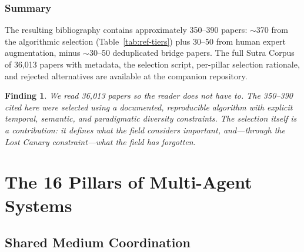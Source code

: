 \documentclass{article}
\newtheorem{finding}{Finding}
\begin{document}
\subsubsection{Summary}

The resulting bibliography contains approximately 350--390 papers:
$\sim$370 from the algorithmic selection (Table~\ref{tab:ref-tiers})
plus 30--50 from human expert augmentation, minus $\sim$30--50
deduplicated bridge papers. The full Sutra Corpus of 36,013 papers
with metadata, the selection script, per-pillar selection rationale,
and rejected alternatives are available at the companion repository.

\begin{finding}
We read 36,013 papers so the reader does not have to. The 350--390
cited here were selected using a documented, reproducible algorithm
with explicit temporal, semantic, and paradigmatic diversity constraints.
The selection itself is a contribution: it defines what the field considers
important, and---through the Lost Canary constraint---what the field has
forgotten.
\end{finding}


%
\section{The 16 Pillars of Multi-Agent Systems}
\label{sec:pillars}

\subsection{Shared Medium Coordination}
\label{sec:p-blackboard}

%
%
%
%
%
\end{document}
